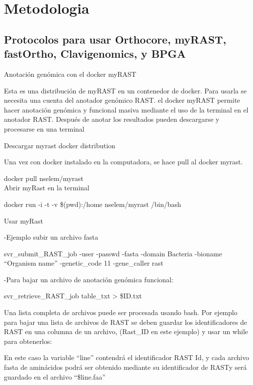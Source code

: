 \documentclass[12pt,twoside]{reedthesis}
\begin{document}
  \chapter*{Metodologia}\label{metodologia-1}
  
  \setcounter{chapter}{4} \setcounter{section}{0}
  
  \section{Protocolos para usar Orthocore, myRAST, fastOrtho,
  Clavigenomics, y
  BPGA}\label{protocolos-para-usar-orthocore-myrast-fastortho-clavigenomics-y-bpga}
  
  Anotación genómica con el docker myRAST
  
  Esta es una distribución de myRAST en un contenedor de docker. Para
  usarla se necesita una cuenta del anotador genómico RAST. el docker
  myRAST permite hacer anotación genómica y funcional masiva mediante el
  uso de la terminal en el anotador RAST. Después de anotar los resultados
  pueden descargarse y procesarse en una terminal
  
  Descargar myrast docker distribution
  
  Una vez con docker instalado en la computadora, se hace pull al docker
  myrast.
  
  docker pull nselem/myrast\\
  Abrir myRast en la terminal
  
  docker run -i -t -v \$(pwd):/home nselem/myrast /bin/bash
  
  Usar myRast
  
  -Ejemplo subir un archivo fasta
  
  svr\_submit\_RAST\_job -user -passwd -fasta -domain Bacteria -bioname
  ``Organism name'' -genetic\_code 11 -gene\_caller rast
  
  -Para bajar un archivo de anotación genómica funcional:
  
  svr\_retrieve\_RAST\_job table\_txt \textgreater{} \$ID.txt
  
  Una lista completa de archivos puede ser procesada usando bash. Por
  ejemplo para bajar una lista de archivos de RAST se deben guardar los
  identificadores de RAST en una columna de un archivo, (Rast\_ID en este
  ejemplo) y usar un while para obtenerlos:
  
  En este caso la variable ``line'' contendrá el identificador RAST Id, y
  cada archivo fasta de aminácidos podrá ser obtenido mediante su
  identificador de RASTy será guardado en el archivo ``\$line.faa''
  
\end{document}
